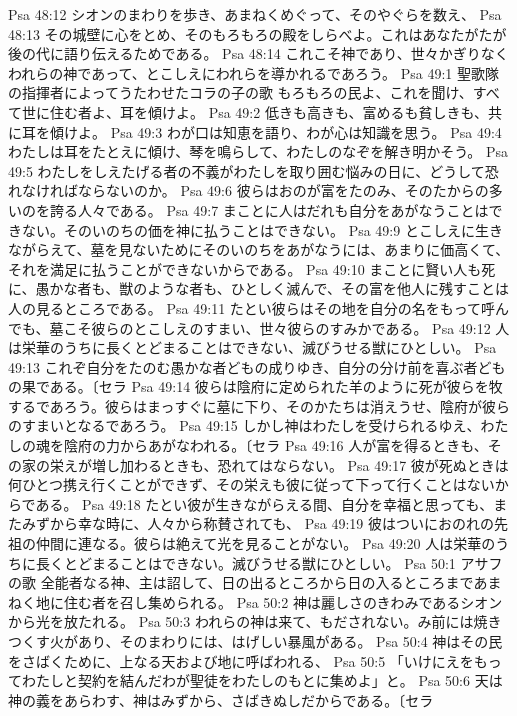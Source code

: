 Psa 48:12  シオンのまわりを歩き、あまねくめぐって、そのやぐらを数え、
Psa 48:13  その城壁に心をとめ、そのもろもろの殿をしらべよ。これはあなたがたが後の代に語り伝えるためである。
Psa 48:14  これこそ神であり、世々かぎりなくわれらの神であって、とこしえにわれらを導かれるであろう。
Psa 49:1  聖歌隊の指揮者によってうたわせたコラの子の歌 もろもろの民よ、これを聞け、すべて世に住む者よ、耳を傾けよ。
Psa 49:2  低きも高きも、富めるも貧しきも、共に耳を傾けよ。
Psa 49:3  わが口は知恵を語り、わが心は知識を思う。
Psa 49:4  わたしは耳をたとえに傾け、琴を鳴らして、わたしのなぞを解き明かそう。
Psa 49:5  わたしをしえたげる者の不義がわたしを取り囲む悩みの日に、どうして恐れなければならないのか。
Psa 49:6  彼らはおのが富をたのみ、そのたからの多いのを誇る人々である。
Psa 49:7  まことに人はだれも自分をあがなうことはできない。そのいのちの価を神に払うことはできない。
Psa 49:9  とこしえに生きながらえて、墓を見ないためにそのいのちをあがなうには、あまりに価高くて、それを満足に払うことができないからである。
Psa 49:10  まことに賢い人も死に、愚かな者も、獣のような者も、ひとしく滅んで、その富を他人に残すことは人の見るところである。
Psa 49:11  たとい彼らはその地を自分の名をもって呼んでも、墓こそ彼らのとこしえのすまい、世々彼らのすみかである。
Psa 49:12  人は栄華のうちに長くとどまることはできない、滅びうせる獣にひとしい。
Psa 49:13  これぞ自分をたのむ愚かな者どもの成りゆき、自分の分け前を喜ぶ者どもの果である。〔セラ
Psa 49:14  彼らは陰府に定められた羊のように死が彼らを牧するであろう。彼らはまっすぐに墓に下り、そのかたちは消えうせ、陰府が彼らのすまいとなるであろう。
Psa 49:15  しかし神はわたしを受けられるゆえ、わたしの魂を陰府の力からあがなわれる。〔セラ
Psa 49:16  人が富を得るときも、その家の栄えが増し加わるときも、恐れてはならない。
Psa 49:17  彼が死ぬときは何ひとつ携え行くことができず、その栄えも彼に従って下って行くことはないからである。
Psa 49:18  たとい彼が生きながらえる間、自分を幸福と思っても、またみずから幸な時に、人々から称賛されても、
Psa 49:19  彼はついにおのれの先祖の仲間に連なる。彼らは絶えて光を見ることがない。
Psa 49:20  人は栄華のうちに長くとどまることはできない。滅びうせる獣にひとしい。
Psa 50:1  アサフの歌 全能者なる神、主は詔して、日の出るところから日の入るところまであまねく地に住む者を召し集められる。
Psa 50:2  神は麗しさのきわみであるシオンから光を放たれる。
Psa 50:3  われらの神は来て、もだされない。み前には焼きつくす火があり、そのまわりには、はげしい暴風がある。
Psa 50:4  神はその民をさばくために、上なる天および地に呼ばわれる、
Psa 50:5  「いけにえをもってわたしと契約を結んだわが聖徒をわたしのもとに集めよ」と。
Psa 50:6  天は神の義をあらわす、神はみずから、さばきぬしだからである。〔セラ
